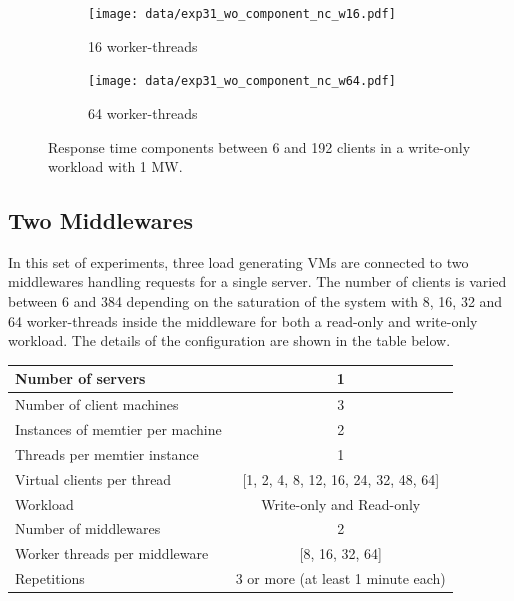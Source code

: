\documentclass[report.tex]{subfiles}
\begin{document}
\begin{figure}[H]
	\begin{subfigure}[b]{.499\linewidth}
		\centering
		\texttt{[image: data/exp31\_wo\_component\_nc\_w16.pdf]}
		\caption{16 worker-threads}
	\end{subfigure}\hfill
	\begin{subfigure}[b]{.499\linewidth}
		\centering
		\texttt{[image: data/exp31\_wo\_component\_nc\_w64.pdf]}
		\caption{64 worker-threads}
	\end{subfigure}\hfill
	\caption{Response time components between 6 and 192 clients in a write-only workload with 1 MW.}\label{exp31_wo_component_nc}
\end{figure}


\subsection{Two Middlewares}\label{exp32}


In this set of experiments, three load generating VMs are connected to two middlewares handling requests for a single server. 
The number of clients is varied between 6 and 384 depending on the saturation of the system with 8, 16, 32 and 64 worker-threads inside the middleware for both a read-only and write-only workload. The details of the configuration are shown in the table below.


\begin{center}
	\scriptsize{
		\begin{tabular}{|l|c|}
			\hline Number of servers                & 1                        \\ 
			\hline Number of client machines        & 3                        \\ 
			\hline Instances of memtier per machine & 2                        \\ 
			\hline Threads per memtier instance     & 1                        \\
			\hline Virtual clients per thread       & [1, 2, 4, 8, 12, 16, 24, 32, 48, 64] \\ 
			\hline Workload                         & Write-only and Read-only \\
			\hline Number of middlewares            & 2                        \\
			\hline Worker threads per middleware    & [8, 16, 32, 64]                  \\
			\hline Repetitions                      & 3 or more (at least 1 minute each)                \\ 
			\hline 
		\end{tabular}
	} 
\end{center}
\end{document}
